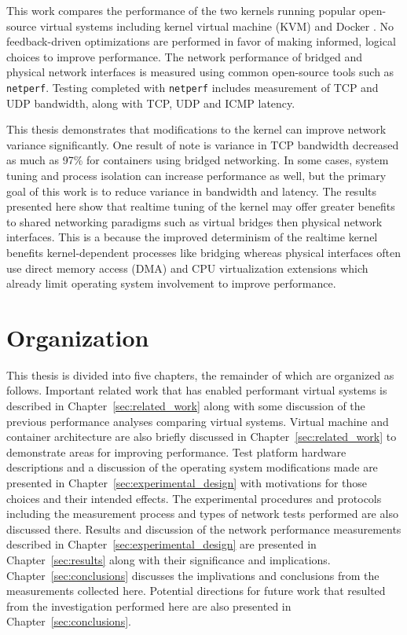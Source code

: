 This work compares the performance of the two kernels running popular open-source virtual systems including kernel virtual machine (KVM) and Docker \autocite{dockerdotcom}.
No feedback-driven optimizations are performed in favor of making informed, logical choices to improve performance.
The network performance of bridged and physical network interfaces is measured using common open-source tools such as \texttt{netperf}.
Testing completed with \texttt{netperf} includes measurement of TCP and UDP bandwidth, along with TCP, UDP and ICMP latency.

This thesis demonstrates that modifications to the kernel can improve network variance significantly.  
One result of note is variance in TCP bandwidth decreased as much as 97\% for containers using bridged networking.
In some cases, system tuning and process isolation can increase performance as well, but the primary goal of this work is to reduce variance in bandwidth and latency.
The results presented here show that realtime tuning of the kernel may offer greater benefits to shared networking paradigms such as virtual bridges then physical network interfaces.
This is a because the improved determinism of the realtime kernel benefits kernel-dependent processes like bridging whereas physical interfaces often use direct memory access (DMA) and CPU virtualization extensions which already limit operating system involvement to improve performance. 

\section{Organization} %
\label{sec:introorganization}

This thesis is divided into five chapters, the remainder of which are organized as follows.
Important related work that has enabled performant virtual systems is described in Chapter~\ref{sec:related_work} along with some discussion of the previous performance analyses comparing virtual systems.
Virtual machine and container architecture are also briefly discussed in Chapter~\ref{sec:related_work} to demonstrate areas for improving performance.
Test platform hardware descriptions and a discussion of the operating system modifications made are presented in Chapter~\ref{sec:experimental_design} with motivations for those choices and their intended effects.
The experimental procedures and protocols including the measurement process and types of network tests performed are also discussed there.
Results and discussion of the network performance measurements described in Chapter~\ref{sec:experimental_design} are presented in Chapter~\ref{sec:results} along with their significance and implications.  
Chapter~\ref{sec:conclusions} discusses the implivations and conclusions from the measurements collected here.
Potential directions for future work that resulted from the investigation performed here are also presented in Chapter~\ref{sec:conclusions}.

\nocite{welchgenivt}
